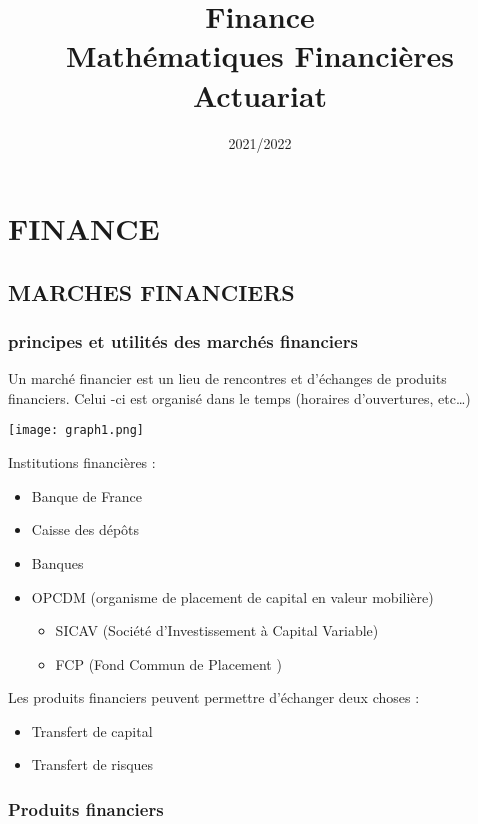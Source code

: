 \documentclass{report}
\title{Finance\\Mathématiques Financières\\Actuariat}
\author{}
\date{2021/2022}
\begin{document}
\maketitle
\tableofcontents
\newpage
\chapter{FINANCE}

\section{MARCHES FINANCIERS}
\subsection{principes et utilités des marchés financiers}

Un marché financier est un lieu de rencontres et d’échanges de produits financiers. Celui -ci est organisé dans le temps (horaires d’ouvertures, etc…)

\noindent%
\begin{minipage}{.5\textwidth}%
\texttt{[image: graph1.png]}
\end{minipage}%
\hfill
\begin{minipage}{.55\textwidth}%
Institutions financières : 
\begin{itemize}
    \item Banque de France
    \item Caisse des dépôts 
    \item Banques
    \item OPCDM (organisme de placement de capital en valeur mobilière)
        \begin{itemize}
        \item SICAV (Société d’Investissement à Capital Variable)
        \item FCP (Fond Commun de Placement )
        \end{itemize}
\end{itemize}
\end{minipage}%

Les produits financiers peuvent permettre d’échanger deux choses :
\begin{itemize}
    \item Transfert de capital
    \item Transfert de risques
\end{itemize}

\subsection{Produits financiers}
\end{document}
